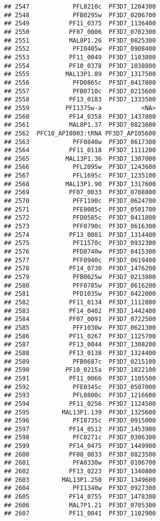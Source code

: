 \documentclass{article}\usepackage[]{graphicx}\usepackage[]{color}
\makeatletter
\newenvironment{kframe}{%
 \def\at@end@of@kframe{}%
 \ifinner\ifhmode%
  \def\at@end@of@kframe{\end{minipage}}%
  \begin{minipage}{\columnwidth}%
 \fi\fi%
 \def\FrameCommand##1{\hskip\@totalleftmargin \hskip-\fboxsep
 \colorbox{shadecolor}{##1}\hskip-\fboxsep
     \hskip-\linewidth \hskip-\@totalleftmargin \hskip\columnwidth}%
 \MakeFramed {\advance\hsize-\width
   \@totalleftmargin\z@ \linewidth\hsize
   \@setminipage}}%
 {\par\unskip\endMakeFramed%
 \at@end@of@kframe}
\newenvironment{knitrout}{}{} %
\makeatother
\begin{document}
\begin{knitrout}
\begin{kframe}
\begin{verbatim}
## 2547            PFL0210c  PF3D7_1204300
## 2548            PFB0295w  PF3D7_0206700
## 2549           PF11_0375  PF3D7_1136400
## 2550           PF07_0006  PF3D7_0702300
## 2551           MAL8P1.26  PF3D7_0825300
## 2552            PFI0405w  PF3D7_0908400
## 2553           PF11_0049  PF3D7_1103800
## 2554           PF10_0378  PF3D7_1038800
## 2555          MAL13P1.89  PF3D7_1317500
## 2556            PFD0865c  PF3D7_0417800
## 2557            PFB0710c  PF3D7_0215600
## 2558           PF13_0183  PF3D7_1333500
## 2559          PFI1375w-a           <NA>
## 2560           PF14_0358  PF3D7_1437800
## 2561           MAL8P1.37  PF3D7_0823600
## 2562  PFC10_API0003:tRNA PF3D7_API05600
## 2563            PFF0840w  PF3D7_0617300
## 2564           PF11_0118  PF3D7_1111200
## 2565          MAL13P1.36  PF3D7_1307000
## 2566            PFL2095w  PF3D7_1243600
## 2567            PFL1695c  PF3D7_1235100
## 2568          MAL13P1.90  PF3D7_1317600
## 2569           PF07_0033  PF3D7_0708800
## 2570            PFF1190c  PF3D7_0624700
## 2571            PFE0085c  PF3D7_0501700
## 2572            PFD0585c  PF3D7_0411800
## 2573            PFF0790c  PF3D7_0616300
## 2574           PF13_0081  PF3D7_1314400
## 2575            PFI1570c  PF3D7_0932300
## 2576            PFD0740w  PF3D7_0415300
## 2577            PFF0940c  PF3D7_0619400
## 2578           PF14_0730  PF3D7_1476200
## 2579            PFB0625w  PF3D7_0213800
## 2580            PFF0785w  PF3D7_0616200
## 2581            PFD1035w  PF3D7_0422000
## 2582           PF11_0134  PF3D7_1112800
## 2583           PF14_0402  PF3D7_1442400
## 2584           PF07_0091  PF3D7_0722500
## 2585            PFF1030w  PF3D7_0621300
## 2586           PF11_0267  PF3D7_1125700
## 2587           PF13_0044  PF3D7_1308200
## 2588           PF13_0138  PF3D7_1324400
## 2589            PFB0687c  PF3D7_0215100
## 2590          PF10_0215a  PF3D7_1022100
## 2591           PF11_0066  PF3D7_1105500
## 2592            PFE0345c  PF3D7_0507000
## 2593            PFL0800c  PF3D7_1216600
## 2594           PF11_0256  PF3D7_1124500
## 2595         MAL13P1.139  PF3D7_1325600
## 2596            PFI0735c  PF3D7_0915000
## 2597           PF14_0512  PF3D7_1453900
## 2598            PFC0271c  PF3D7_0306300
## 2599           PF14_0475  PF3D7_1449900
## 2600           PF08_0033  PF3D7_0823500
## 2601            PFA0330w  PF3D7_0106700
## 2602           PF13_0223  PF3D7_1340800
## 2603         MAL13P1.250  PF3D7_1349600
## 2604            PFI1340w  PF3D7_0927300
## 2605           PF14_0755  PF3D7_1478300
## 2606           MAL7P1.21  PF3D7_0705300
## 2607           PF11_0041  PF3D7_1102900

\end{verbatim}
\end{kframe}
\end{knitrout}
\end{document}
